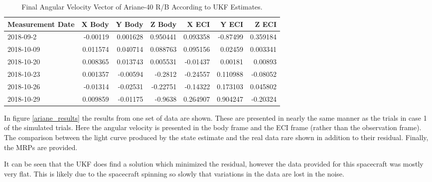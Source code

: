 \begin{table}[htbp]
	\centering
	
	\begin{tabular}{| l | r | r | r | r| r | r |}
		\hline Measurement Date & X Body & Y Body & Z Body & X ECI & Y ECI & Z ECI \\
		\hline 2018-09-2 & -0.00119 & 0.001628 & 0.950441 & 0.093358 & -0.87499 & 0.359184 \\
		\hline 2018-10-09 & 0.011574 & 0.040714 & 0.088763 & 0.095156 & 0.02459 & 0.003341 \\
		\hline 2018-10-20 & 0.008365 & 0.013743 & 0.005531 & -0.01437 & 0.00181 & 0.00893 \\
		\hline 2018-10-23 & 0.001357 & -0.00594 & -0.2812 & -0.24557 & 0.110988 & -0.08052 \\
		\hline 2018-10-26 & -0.01314 & -0.02531 & -0.22751 & -0.14322 & 0.173103 & 0.045802 \\
		\hline 2018-10-29 & 0.009859 & -0.01175 & -0.9638 & 0.264907 & 0.904247 & -0.20324 \\
		\hline 
	\end{tabular}%
	\caption{Final Angular Velocity Vector of Ariane-40 R/B According to UKF Estimates.}
	\label{ariane_table}
\end{table}%

In figure \ref{ariane_results} the results from one set of data are shown. These are presented in nearly the same manner as the trials in case 1 of the simulated trials. Here the angular velocity is presented in the body frame and the ECI frame (rather than the observation frame). The comparison between the light curve produced by the state estimate and the real data rare shown in addition to their residual. Finally, the MRPs are provided.

It can be seen that the UKF does find a solution which minimized the residual, however the data provided for this spacecraft was mostly very flat. This is likely due to the spacecraft spinning so slowly that variations in the data are lost in the noise.

